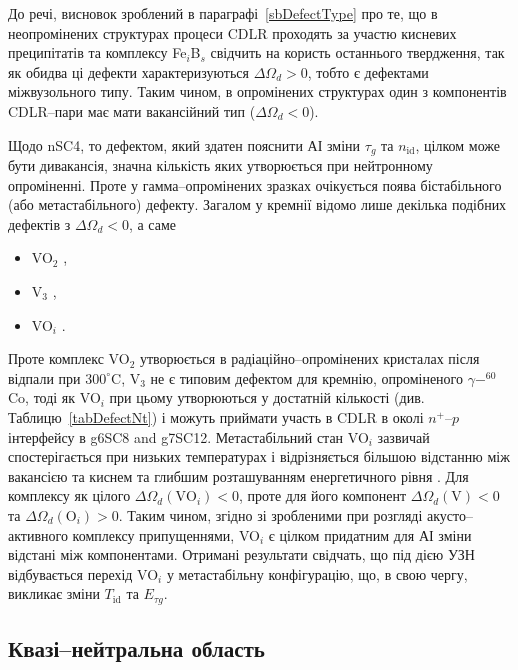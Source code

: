 До речі, висновок зроблений в параграфі~\ref{sbDefectType} про те, що
в неопромінених структурах процеси CDLR проходять за участю кисневих преципітатів та комплексу Fe$_i$B$_s$ свідчить на користь
останнього твердження, так як обидва ці дефекти характеризуються $\Delta\Omega_d>0$, тобто є дефектами міжвузольного типу.
Таким чином, в опромінених структурах один з компонентів CDLR--пари
має мати вакансійний тип ($\Delta\Omega_d<0$).

Щодо nSC4, то дефектом, який здатен пояснити АІ зміни $\tau_g$ та $n_\mathrm{id}$, цілком може бути дивакансія,
значна кількість яких утворюється при нейтронному опроміненні.
Проте у гамма--опромінених зразках очікується поява бістабільного (або метастабільного) дефекту.
Загалом у кремнії відомо лише декілька подібних дефектів з $\Delta\Omega_d<0$, а саме
\begin{itemize}
  \item VO$_2$ \cite{FTP:Murin},
  \item V$_3$ \cite{V3:Markevich},
  \item VO$_i$ \cite{MetaUFN}.
\end{itemize}
Проте комплекс VO$_2$ утворюється в радіаційно--опромінених кристалах після відпали при $300^\circ$C,
V$_3$ не є типовим дефектом для кремнію, опроміненого $\gamma-^{60}$Co,
тоді як VO$_i$ при цьому утворюються у достатній кількості (див. Таблицю~\ref{tabDefectNt}) і можуть приймати
участь в CDLR в околі $n^+$--$p$ інтерфейсу в g6SC8 and g7SC12.
Метастабільний стан VO$_i$ зазвичай спостерігається при низьких температурах
і відрізняється більшою відстанню між вакансією та киснем та глибшим розташуванням енергетичного рівня \cite{MetaUFN}.
Для комплексу як цілого $\Delta\Omega_d(\mbox{VO}_i)<0$,
проте для його компонент $\Delta\Omega_d(\mbox{V})<0$ та $\Delta\Omega_d(\mbox{O}_i)>0$.
Таким чином, згідно зі зробленими при розгляді акусто--активного комплексу припущеннями,
VO$_i$ є цілком придатним для АІ зміни відстані між компонентами.
Отримані результати свідчать, що під дією УЗН  відбувається
перехід VO$_i$ у метастабільну конфігурацію, що, в свою чергу,
викликає зміни $T_{\mathrm{id}}$ та $E_{\tau g}$.





\subsection{Квазі--нейтральна область\label{sbRadDef}}

